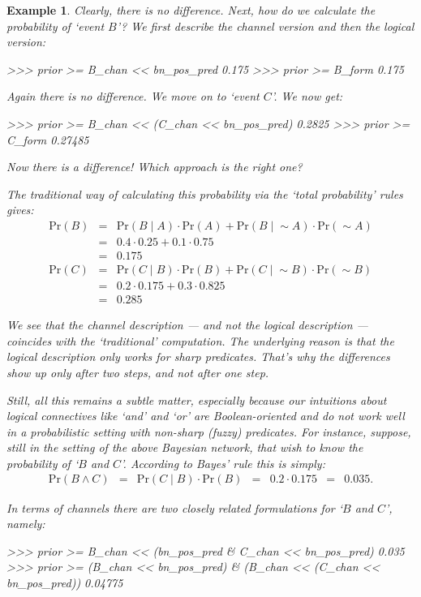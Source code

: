 \documentclass[leqno]{tufte-book} %
\newtheorem{example}[theorem]{Example}
\newcommand{\ortho}{\mathop{\sim}}
\newcommand{\Prob}[1]{\mathrm{Pr}\left({#1}\right)}
\begin{document}
\begin{example}
\noindent Clearly, there is no difference. Next, how do we calculate
the probability of `event $B$'? We first describe the channel version
and then the logical version:
\begin{python}
>>> prior >= B_chan << bn_pos_pred
0.175
>>> prior >= B_form
0.175
\end{python}

\noindent Again there is no difference. We move on to `event $C$'. We
now get:
\begin{python}
>>> prior >= B_chan << (C_chan << bn_pos_pred)
0.2825
>>> prior >= C_form 
0.27485
\end{python}

\noindent Now there is a difference! Which approach is the right one?

The traditional way of calculating this probability via the `total
probability' rules gives:
$$\begin{array}{rcl}
\Prob{B}
& = &
\Prob{B\mid A}\cdot \Prob{A} + \Prob{B\mid \ortho{A}}\cdot \Prob{\ortho{A}}
\\
& = &
0.4 \cdot 0.25 + 0.1 \cdot 0.75
\\
&  = &
0.175
\\
\Prob{C}
& = &
\Prob{C\mid B}\cdot \Prob{B} + \Prob{C\mid \ortho{B}}\cdot\Prob{\ortho{B}}
\\
& = &
0.2 \cdot 0.175 + 0.3 \cdot 0.825
\\
& = &
0.285
\end{array}$$

\noindent We see that the channel description --- and not the logical
description --- coincides with the `traditional' computation. The
underlying reason is that the logical description only works for sharp
predicates. That's why the differences show up only after two steps,
and not after one step.

Still, all this remains a subtle matter, especially because our
intuitions about logical connectives like `and' and `or' are
Boolean-oriented and do not work well in a probabilistic setting with
non-sharp (fuzzy) predicates. For instance, suppose, still in the setting
of the above Bayesian network, that wish to know the probability
of `$B$ and $C$'. According to Bayes' rule this is simply:
$$\begin{array}{rcccccl}
\Prob{B \wedge C}
& = &
\Prob{C \mid B} \cdot \Prob{B}
& = &
0.2 \cdot 0.175
& = &
0.035.
\end{array}$$

\noindent In terms of channels there are two closely related
formulations for `$B$ and $C$', namely:
\begin{python}
>>> prior >= B_chan << (bn_pos_pred & C_chan << bn_pos_pred)
0.035
>>> prior >= (B_chan << bn_pos_pred) & (B_chan << (C_chan << bn_pos_pred))
0.04775
\end{python}


\end{example}
\end{document}
